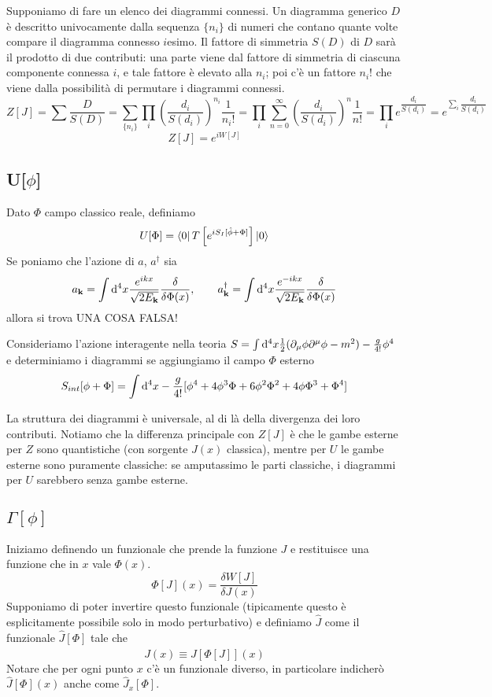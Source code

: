 \documentclass[a4paper, 11pt]{article}
\begin{document}
	Supponiamo di fare un elenco dei diagrammi connessi. Un diagramma generico $D$ è descritto univocamente dalla sequenza $\{n_i\}$ di numeri che contano quante volte compare il diagramma connesso $i$esimo. Il fattore di simmetria $S(D)$ di $D$ sarà il prodotto di due contributi: una parte viene dal fattore di simmetria di ciascuna componente connessa $i$, e tale fattore è elevato alla $n_i$; poi c'è un fattore $n_i!$ che viene dalla possibilità di permutare i diagrammi connessi.
	\[ Z[J] = \sum \dfrac{D}{S(D)} = \sum_{\{n_i\}} \prod_i \left(\dfrac{d_i}{S(d_i)}\right)^{n_i}\frac{1}{n_i!} = \prod_i \sum_{n=0}^{\infty} \left( \dfrac{d_i}{S(d_i)} \right)^n \dfrac{1}{n!} = \prod_{i} e^{\dfrac{d_i}{S(d_i)}} = e^{\sum_i \dfrac{d_i}{S(d_i)}} \]
	\[ Z[J] = e^{iW[J]} \]
	
	\subsection{U[$\phi$]}
	Dato $\Phi$ campo classico reale, definiamo
	\[ U[\Phi] = \left\langle 0\right|T\left[e^{iS_I[\hat{\phi}+\Phi]}\right]\left| 0\right\rangle \]%
	Se poniamo che l'azione di $a$, $a^\dagger$ sia
	\[ a_\mathbf{k} = \int\mathrm{d}^4x \dfrac{e^{ikx}}{\sqrt{2E_\mathbf{k}}} \dfrac{\delta}{\delta \Phi(x)},\qquad
	a_\mathbf{k}^\dagger = \int\mathrm{d}^4x \dfrac{e^{-ikx}}{\sqrt{2E_\mathbf{k}}} \dfrac{\delta}{\delta \Phi(x)} \]
	allora si trova UNA COSA FALSA!%
	
	Consideriamo l'azione interagente nella teoria $S = \int \mathrm{d}^4x \frac{1}{2}(\partial_\mu\phi\partial^\mu\phi-m^2)-\frac{g}{4!}\phi^4$ e determiniamo i diagrammi se aggiungiamo il campo $\Phi$ esterno
	\[ S_{int}[\phi+\Phi] = \int\mathrm{d}^4x -\frac{g}{4!} [\phi^4+4\phi^3\Phi+6\phi^2\Phi^2+4\phi\Phi^3+\Phi^4] \]
	
	La struttura dei diagrammi è universale, al di là della divergenza dei loro contributi. Notiamo che la differenza principale con $Z[J]$ è che le gambe esterne per $Z$ sono quantistiche (con sorgente $J(x)$ classica), mentre per $U$ le gambe esterne sono puramente classiche: se amputassimo le parti classiche, i diagrammi per $U$ sarebbero senza gambe esterne.
	
	\subsection{$\Gamma[\phi]$}
	Iniziamo definendo un funzionale che prende la funzione $J$ e restituisce una funzione che in $x$ vale $\Phi(x)$.
	\[ \Phi[J](x) = \dfrac{\delta W[J]}{\delta J(x)} \]
	Supponiamo di poter invertire questo funzionale (tipicamente questo è esplicitamente possibile solo in modo perturbativo) e definiamo $\hat{J}$ come il funzionale $\hat{J}[\Phi]$ tale che
	\[ J(x) \equiv \hat{J}[\Phi[J]](x) \]
	Notare che per ogni punto $x$ c'è un funzionale diverso, in particolare indicherò $\hat{J}[\Phi](x)$ anche come $\hat{J}_x[\Phi]$.
\end{document}
